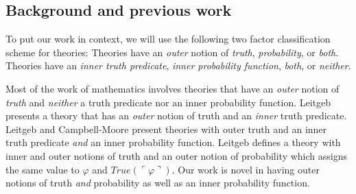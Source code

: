 \documentclass[12pt]{article}
\newcommand{\vp}{\varphi}
\theoremstyle{plain}
\theoremstyle{definition}
\theoremstyle{remark}
\begin{document}
\subsection{Background and previous work}


To put our work in context, we will use the following two factor %
classification scheme for theories: Theories have an \emph{outer} notion of \emph{truth}, \emph{probability}, or \emph{both}.
Theories have an \emph{inner truth predicate}, \emph{inner probability function}, \emph{both}, or \emph{neither}.

Most of the work of mathematics involves theories that have an \emph{outer} notion of \emph{truth} and \emph{neither} a truth predicate nor an inner probability function.
Leitgeb\cite{leitgeb12a} presents a theory that has an \emph{outer} notion of truth and an \emph{inner} truth predicate.
Leitgeb\cite{leitgeb12b} and Campbell-Moore\cite{campbell14} present theories with outer truth and an inner truth predicate \emph{and} an inner probability function.
Leitgeb\cite{leitgeb08} defines a theory with inner and outer notions of truth and an outer notion of probability which assigns the same value to $\varphi$ and $True(\ulcorner\vp\urcorner)$.
Our work is novel in having outer notions of truth \emph{and} probability as well as an inner probability function.
\end{document}
